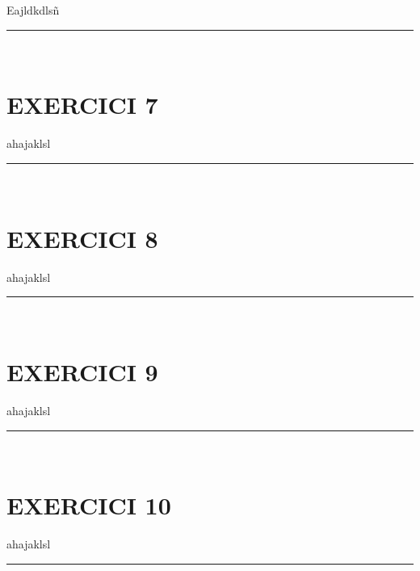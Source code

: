 \documentclass[a4paper, 11pt]{article}
\begin{document}
\noindent Eajldkdlsñ

\vspace{10mm}
\hrule\
\vspace{5mm}


\section*{EXERCICI 7}
\noindent ahajaklsl
\vspace{10mm}
\hrule\
\vspace{5mm}


\section*{EXERCICI 8}
\noindent ahajaklsl
\vspace{10mm}
\hrule\
\vspace{5mm}


\section*{EXERCICI 9}
\noindent ahajaklsl
\vspace{10mm}
\hrule\
\vspace{5mm}


\section*{EXERCICI 10}
\noindent ahajaklsl
\vspace{10mm}
\hrule\
\vspace{5mm}


























\newpage
\printbibliography
\end{document}
